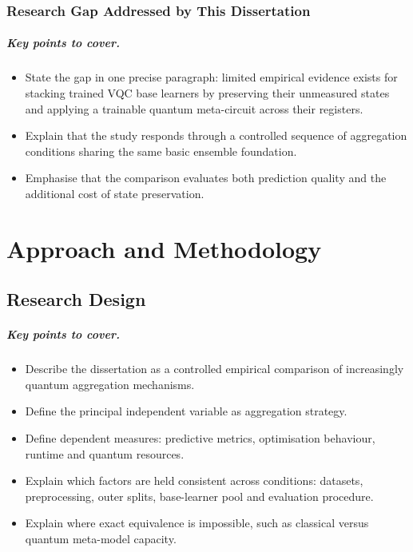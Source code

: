 \documentclass[]{UCD_CS_MSc_AAI_Report}
\newcommand{\sectionbrief}{\paragraph{Key points to cover.}}
\begin{document}
\subsection{Research Gap Addressed by This Dissertation}

\sectionbrief
\begin{itemize}
    \item State the gap in one precise paragraph: limited empirical evidence exists for stacking trained VQC base learners by preserving their unmeasured states and applying a trainable quantum meta-circuit across their registers.
    \item Explain that the study responds through a controlled sequence of aggregation conditions sharing the same basic ensemble foundation.
    \item Emphasise that the comparison evaluates both prediction quality and the additional cost of state preservation.
\end{itemize}

\chapter{Approach and Methodology}
\label{chap:methodology}

\section{Research Design}
\label{sec:method-research-design}

\sectionbrief
\begin{itemize}
    \item Describe the dissertation as a controlled empirical comparison of increasingly quantum aggregation mechanisms.
    \item Define the principal independent variable as aggregation strategy.
    \item Define dependent measures: predictive metrics, optimisation behaviour, runtime and quantum resources.
    \item Explain which factors are held consistent across conditions: datasets, preprocessing, outer splits, base-learner pool and evaluation procedure.
    \item Explain where exact equivalence is impossible, such as classical versus quantum meta-model capacity.
\end{itemize}
\end{document}
